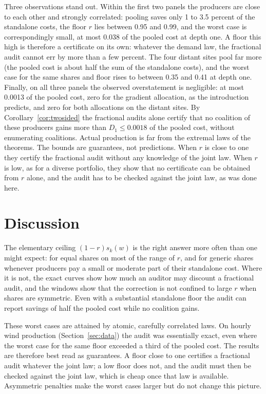 \documentclass[11pt,a4paper]{article}
\theoremstyle{remark}
\begin{document}
Three observations stand out. Within the first two panels the producers are
close to each other and strongly correlated: pooling saves only 1 to
3.5 percent of the standalone costs, the floor $r$ lies between 0.95 and 0.99,
and the worst case is correspondingly small, at most 0.038 of the pooled cost
at depth one. A floor this high is therefore a certificate on its own:
whatever the demand law, the fractional audit cannot err by more than a few
percent. The four distant sites pool far more (the pooled cost is about half
the sum of the standalone costs), and the worst case for the same shares and
floor rises to between 0.35 and 0.41 at depth one. Finally, on all three
panels the observed overstatement is negligible: at most 0.0013 of the pooled
cost, zero for the gradient allocation, as the introduction predicts, and zero
for both allocations on the distant sites. By Corollary~\ref{cor:twosided} the
fractional audits alone certify that no coalition of these producers gains
more than $D_1\le 0.0018$ of the pooled cost, without enumerating coalitions.
Actual production is far from the extremal laws of the theorems. The bounds are guarantees, not predictions.
When $r$ is close to one they certify the fractional audit without any
knowledge of the joint law. When $r$ is low, as for a diverse portfolio, they
show that no certificate can be obtained from $r$ alone, and the audit has to
be checked against the joint law, as was done here.

\section{Discussion}

The elementary ceiling $(1-r)s_k(w)$ is the right answer more often than one
might expect: for equal shares on most of the range of $r$, and for generic
shares whenever producers pay a small or moderate part of their standalone
cost. Where it is not, the exact curves show how much an auditor may discount a
fractional audit, and the windows show that the correction is not confined to
large $r$ when shares are symmetric. Even with a substantial standalone floor
the audit can report savings of half the pooled cost while no coalition gains.

These worst cases are attained by atomic, carefully correlated laws. On
hourly wind production (Section~\ref{sec:data}) the audit was essentially
exact, even where the worst case for the same floor exceeded a third of the
pooled cost. The results are therefore best read as guarantees. A floor close
to one certifies a fractional audit whatever the joint law; a low floor does
not, and the audit must then be checked against the joint law, which is
cheap once that law is available. Asymmetric penalties make the worst cases
larger but do not change this picture.
\end{document}
